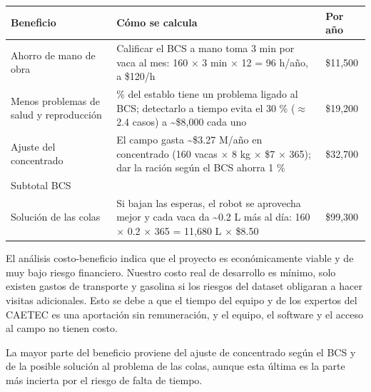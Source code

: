 \documentclass[11pt,letterpaper,DIV=12]{scrartcl}
\begin{document}
\bigskip

\noindent
\begin{tabularx}{\textwidth}{>{\raggedright\arraybackslash}X>{\raggedright\arraybackslash}X>{\raggedright\arraybackslash}X}
  \toprule
  Beneficio & Cómo se calcula & Por año \\
  \midrule
  Ahorro de mano de obra & Calificar el BCS a mano toma 3 min por vaca al mes: 160 $\times$ 3 min $\times$ 12 = 96 h/año, a \$120/h & \$11,500 \\
  \addlinespace
  Menos problemas de salud y reproducción & 5 \% del establo tiene un problema ligado al BCS; detectarlo a tiempo evita el 30 \% ($\approx$ 2.4 casos) a \textasciitilde\$8,000 cada uno & \$19,200 \\
  \addlinespace
  Ajuste del concentrado & El campo gasta \textasciitilde\$3.27 M/año en concentrado (160 vacas $\times$ 8 kg $\times$ \$7 $\times$ 365); dar la ración según el BCS ahorra 1 \% & \$32,700 \\
  \midrule
  Subtotal BCS & \multicolumn{2}{r}{\$63,400} \\
  \midrule
  Solución de las colas & Si bajan las esperas, el robot se aprovecha mejor y cada vaca da \textasciitilde 0.2 L más al día: 160 $\times$ 0.2 $\times$ 365 = 11,680 L $\times$ \$8.50 & \$99,300 \\
  \bottomrule
\end{tabularx}

\medskip

El análisis costo-beneficio indica que el proyecto es económicamente viable y de muy bajo riesgo financiero. Nuestro costo real de desarrollo es mínimo, solo existen gastos de transporte y gasolina si los riesgos del dataset obligaran a hacer visitas adicionales. Esto se debe a que el tiempo del equipo y de los expertos del CAETEC es una aportación sin remuneración, y el equipo, el software y el acceso al campo no tienen costo.

La mayor parte del beneficio proviene del ajuste de concentrado según el BCS y de la posible solución al problema de las colas, aunque esta última es la parte más incierta por el riesgo de falta de tiempo.

\printbibliography
\end{document}
